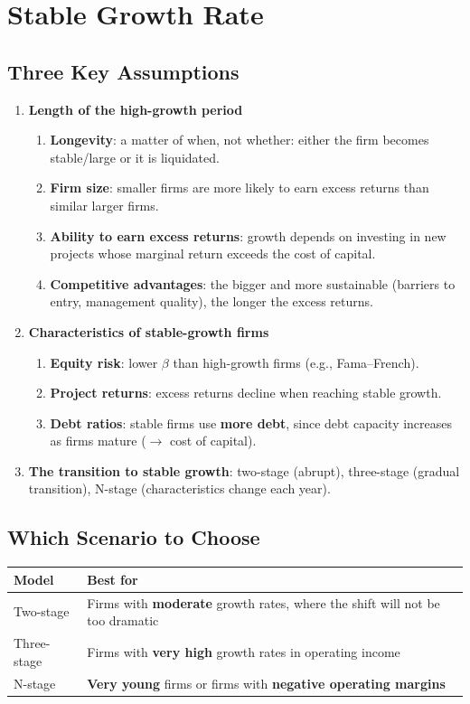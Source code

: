 \section{Stable Growth Rate}

\subsection{Three Key Assumptions}
\begin{enumerate}
  \item \textbf{Length of the high-growth period}
  \begin{enumerate}[label=\alph*)]
    \item \textbf{Longevity}: a matter of when, not whether: either the firm becomes stable/large or it is liquidated.
    \item \textbf{Firm size}: smaller firms are more likely to earn excess returns than similar larger firms.
    \item \textbf{Ability to earn excess returns}: growth depends on investing in new projects whose marginal return exceeds the cost of capital.
    \item \textbf{Competitive advantages}: the bigger and more sustainable (barriers to entry, management quality), the longer the excess returns.
  \end{enumerate}
  \item \textbf{Characteristics of stable-growth firms}
  \begin{enumerate}[label=\alph*)]
    \item \textbf{Equity risk}: lower $\beta$ than high-growth firms (e.g., Fama--French).
    \item \textbf{Project returns}: excess returns decline when reaching stable growth.
    \item \textbf{Debt ratios}: stable firms use \textbf{more debt}, since debt capacity increases as firms mature ($\to$ cost of capital).
  \end{enumerate}
  \item \textbf{The transition to stable growth}: two-stage (abrupt), three-stage (gradual transition), N-stage (characteristics change each year).
\end{enumerate}

\subsection{Which Scenario to Choose}
\begin{center}
\begin{tabular}{@{}ll@{}}
\toprule
\textbf{Model} & \textbf{Best for}\\
\midrule
Two-stage & Firms with \textbf{moderate} growth rates, where the shift will not be too dramatic\\
Three-stage & Firms with \textbf{very high} growth rates in operating income\\
N-stage & \textbf{Very young} firms or firms with \textbf{negative operating margins}\\
\bottomrule
\end{tabular}
\end{center}


